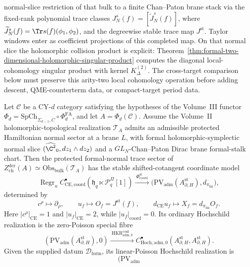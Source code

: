 normal-slice restriction of that bulk to a finite Chan--Paton
brane stack via the fixed-rank polynomial trace classes
\(J_N^s(f)=[\widetilde J_N^s(f)]\), where
\(\widetilde J_N^s(f)=\Tr s(f)(\phi_1,\phi_2)\), and the
degreewise stable trace map \(J^{\mathrm{st}}\).  Taylor windows
enter as coefficient projections of this completed map.
On that normal slice the holomorphic collision product is explicit:
Theorem~\ref{thm:formal-two-dimensional-holomorphic-singular-product}
computes the diagonal local-cohomology singular product with kernel
\(K^{(2)}_\Delta\).  The cross-target comparison below must preserve
this arity-two local cohomology operation before adding descent,
QME-counterterm data, or compact-target period data.

\begin{thm}
\label{thm:completion-cross-target-slice}
Let \(\mathcal C\) be a CY-\(d\) category satisfying the
hypotheses of the Volume~III functor
\(\Phi_d=\mathrm{SpCh}_{\Sigma_{d-1},C}\circ\Phi^{\mathrm{FA}}_d\),
and let \(A=\Phi_d(\mathcal C)\).  Assume the Volume~II
holomorphic-topological realization \(\mathcal T_A\) admits an
admissible protected Hamiltonian normal sector at a brane \(L\),
with formal holomorphic-symplectic normal slice
\((\widehat{\C^2}_0,dz_1\wedge dz_2)\) and a \(GL_N\)-Chan--Paton
Dirac brane formal-stalk chart.  Then the protected formal-normal
trace sector of
\(Z^{\mathrm{der}}_{\mathrm{ch}}(A)\simeq
\mathrm{Obs}_{\mathrm{bulk}}(\mathcal T_A)\) has the
stable shifted-cotangent coordinate model
\[
  \operatorname{Regr}_u
  C^\bullet_{\mathrm{CE},\mathrm{coord}}
    (\mathfrak h_q\ltimes\mathcal P^\Pi_q[1])
  \xrightarrow{\ \Phi_{\mathrm{coord}}^{\mathrm{st}}\ }
  \bigl(\mathrm{PV}_{\mathrm{adm}}
    (A_{\partial,H}^{\mathrm{st}}),
    d_{\pi_{\mathrm{lin}}}\bigr),
\]
determined by
\[
  c^\rho\longmapsto\partial_\rho,\qquad
  u_f\longmapsto O_f=J^{\mathrm{st}}(f),\qquad
  d_{\mathrm{CE}}u_f\longmapsto
  X_f=d_{\pi_{\mathrm{lin}}}O_f.
\]
Here \(|c^\rho|_{\mathrm{CE}}=1\) and
\(|u_f|_{\mathrm{CE}}=2\), while
\(|u_f|_{\mathrm{coord}}=0\).  Its ordinary Hochschild realization is
the zero-Poisson special fibre
\[
  (\mathrm{PV}_{\mathrm{adm}}
    (A_{\partial,H}^{\mathrm{st}}),0)
  \xrightarrow{\ \operatorname{HKR}^{\mathrm{cont}}_{\mathrm{adm},0}\ }
  C^\bullet_{\mathrm{Hoch},\mathrm{adm},0}
    (A_{\partial,H}^{\mathrm{st}},
     A_{\partial,H}^{\mathrm{st}}).
\]
Given the supplied datum \(\mathcal D_{\mathrm{form}}\), its
linear-Poisson Hochschild realization is
\[
  \bigl(\mathrm{PV}_{\mathrm{adm}}
\]
\end{thm}
